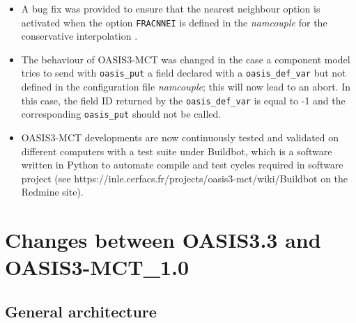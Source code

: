 \begin{itemize}
\item A bug fix was provided to ensure that the nearest neighbour
  option is activated when the option {\tt FRACNNEI} is defined in the
  {\it namcouple} for the conservative interpolation .

\item The behaviour of OASIS3-MCT was changed in the case a
  component model tries to send with {\tt oasis\_put} a field declared
  with a {\tt oasis\_def\_var} but not defined in the configuration
  file {\it namcouple}; this will now lead to an abort. In this case,
  the field ID returned by the {\tt oasis\_def\_var} is equal to -1
  and the corresponding {\tt oasis\_put} should not be called.

\item OASIS3-MCT developments are now continuously tested and
  validated on different computers with a test suite under Buildbot,
  which is a software written in Python to automate compile and test
  cycles required in software project (see
  https://inle.cerfacs.fr/projects/oasis3-mct/wiki/Buildbot on the
  Redmine site).

\end{itemize}

\section{Changes between OASIS3.3 and OASIS3-MCT\_1.0}

\subsection{General architecture}
\label{sec_changes_gen}

